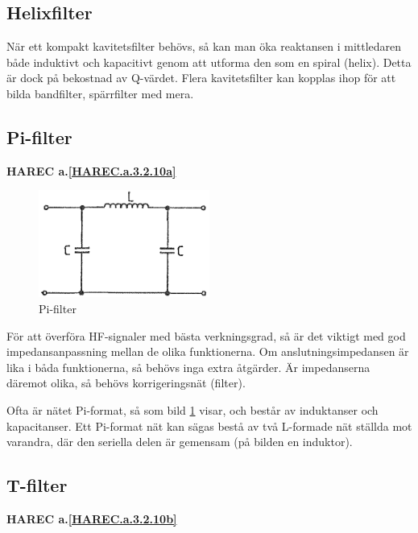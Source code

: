 \subsection{Helixfilter}

När ett kompakt kavitetsfilter behövs, så kan man öka reaktansen i mittledaren
både induktivt och kapacitivt genom att utforma den som en spiral (helix).
Detta är dock på bekostnad av Q-värdet.
Flera kavitetsfilter kan kopplas ihop för att bilda bandfilter, spärrfilter med
mera.

\subsection{Pi-filter}
\textbf{HAREC a.\ref{HAREC.a.3.2.10a}\label{myHAREC.a.3.2.10a}}

\begin{figure}
\includegraphics[width=0.5\textwidth]{images/cropped_pdfs/bild_2_3-32.pdf}
\caption{Pi-filter}
\label{fig:BildII3-32}
\end{figure}

För att överföra HF-signaler med bästa verkningsgrad, så är det viktigt med god
impedansanpassning mellan de olika funktionerna.
Om anslutningsimpedansen är lika i båda funktionerna, så behövs inga extra
åtgärder.
Är impedanserna däremot olika, så behövs korrigeringsnät (filter).

Ofta är nätet Pi-format, så som bild \ref{fig:BildII3-32} visar, och består av
induktanser och kapacitanser.
Ett Pi-format nät kan sägas bestå av två L-formade nät ställda mot varandra, där
den seriella delen är gemensam (på bilden en induktor).

\subsection{T-filter}
\textbf{HAREC a.\ref{HAREC.a.3.2.10b}\label{myHAREC.a.3.2.10b}}

